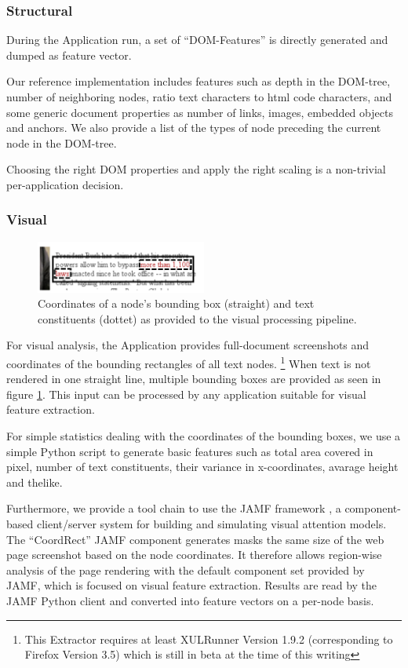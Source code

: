 \subsubsection{Structural}

During the Application run, a set of ``DOM-Features'' is directly generated and dumped as feature vector.

Our reference implementation includes features such as depth in the DOM-tree, number of neighboring nodes, ratio text characters to html code characters,
  and some generic document properties as number of links, images, embedded objects and anchors.
We also provide a list of the types of node preceding the current node in the DOM-tree.

Choosing the right DOM properties and apply the right scaling is a non-trivial per-application decision.

\subsubsection{Visual}

\begin{figure}
\includegraphics[width=0.5\textwidth]{vizwrap}
\caption{\label{f:vizwrap}Coordinates of a node's bounding box (straight) and text constituents (dottet) as provided to the visual processing pipeline.}
\end{figure}

For visual analysis, the Application provides full-document screenshots and coordinates of the bounding rectangles of all text nodes.%
\footnote{This Extractor requires at least XULRunner Version 1.9.2 (corresponding to Firefox Version 3.5) which is still in beta at the time of this writing}
When text is not rendered in one straight line, multiple bounding boxes are provided as seen in figure \ref{f:vizwrap}.
This input can be processed by any application suitable for visual feature extraction.

For simple statistics dealing with the coordinates of the bounding boxes, we use a simple Python script to generate basic features such as total area covered in pixel, number of text constituents, their variance in x-coordinates, avarage height and thelike.

Furthermore, we provide a tool chain to use the JAMF framework \cite{Steger08}, a component-based client/server system for building and simulating visual attention models.
The ``CoordRect'' JAMF component generates masks the same size of the web page screenshot based on the node coordinates.
It therefore allows region-wise analysis of the page rendering with the default component set provided by JAMF, which is focused on visual feature extraction.
Results are read by the JAMF Python client and converted into feature vectors on a per-node basis.

